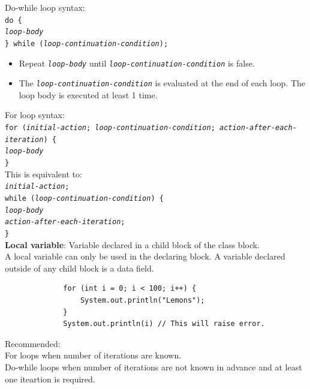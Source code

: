\documentclass{article}
\begin{document}
Do-while loop syntax:\\
\texttt{do \{\\
\hspace*{2em}\textit{loop-body}\\
\} while (\textit{loop-continuation-condition});}
\begin{itemize}
	\item Repeat \texttt{\textit{loop-body}} until \texttt{\textit{loop-continuation-condition}} is false.
	\item The \texttt{\textit{loop-continuation-condition}} is evaluated at the end of each loop. The loop body is executed at least 1 time.
\end{itemize}

For loop syntax:\\
\texttt{for (\textit{initial-action}; \textit{loop-continuation-condition}; \textit{action-after-each-iteration}) \{\\
\hspace*{2em}\textit{loop-body}\\
\}}\\
This is equivalent to:\\
\texttt{\textit{initial-action};\\
while (\textit{loop-continuation-condition}) \{\\
\hspace*{2em}\textit{loop-body}\\
\hspace*{2em}\textit{action-after-each-iteration};\\
\}}\\

\textbf{Local variable}: Variable declared in a child block of the class block.\\
A local variable can only be used in the declaring block. A variable declared outside of any child block is a data field.

\begin{figure}[h]
	\centering
	\begin{verbatim}
		for (int i = 0; i < 100; i++) {
		    System.out.println("Lemons");
		}
		System.out.println(i) // This will raise error.
	\end{verbatim}
\end{figure}

Recommended:\\
For loops when number of iterations are known.\\ Do-while loops when number of iterations are not known in advance and at least one iteartion is required.\\
\end{document}

